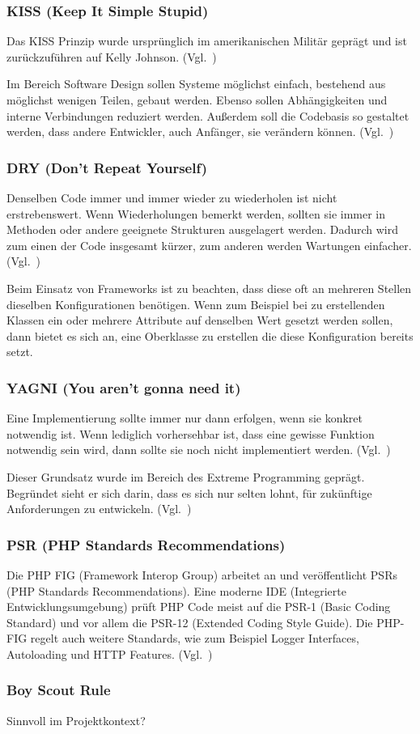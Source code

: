 \subsubsection{KISS (Keep It Simple Stupid)}
Das KISS Prinzip wurde ursprünglich im amerikanischen Militär geprägt und ist zurückzuführen auf Kelly Johnson.
(Vgl.~\cite{kelly-johnson-memoir})

Im Bereich Software Design sollen Systeme möglichst einfach, bestehend aus möglichst wenigen Teilen, gebaut werden.
Ebenso sollen Abhängigkeiten und interne Verbindungen reduziert werden.
Außerdem soll die Codebasis so gestaltet werden, dass andere Entwickler, auch Anfänger, sie verändern können.
(Vgl.~\cite{kiss-principle-explained})

\subsubsection{DRY (Don’t Repeat Yourself)}
Denselben Code immer und immer wieder zu wiederholen ist nicht erstrebenswert.
Wenn Wiederholungen bemerkt werden, sollten sie immer in Methoden oder andere geeignete Strukturen ausgelagert werden.
Dadurch wird zum einen der Code insgesamt kürzer, zum anderen werden Wartungen einfacher.
(Vgl.~\cite{the-pragmatic-programmer})

Beim Einsatz von Frameworks ist zu beachten, dass diese oft an mehreren Stellen dieselben Konfigurationen benötigen.
Wenn zum Beispiel bei zu erstellenden Klassen ein oder mehrere Attribute auf denselben Wert gesetzt werden sollen, dann bietet es sich an, eine Oberklasse zu erstellen die diese Konfiguration bereits setzt.

\subsubsection{YAGNI (You aren't gonna need it)}
Eine Implementierung sollte immer nur dann erfolgen, wenn sie konkret notwendig ist.
Wenn lediglich vorhersehbar ist, dass eine gewisse Funktion notwendig sein wird, dann sollte sie noch nicht implementiert werden.
(Vgl.~\cite{extreme-programming-installed})

Dieser Grundsatz wurde im Bereich des Extreme Programming geprägt.
Begründet sieht er sich darin, dass es sich nur selten lohnt, für zukünftige Anforderungen zu entwickeln.
(Vgl.~\cite{kiss-principle-explained})

\subsubsection{PSR (PHP Standards Recommendations)}
Die PHP FIG (Framework Interop Group) arbeitet an und veröffentlicht PSRs (PHP Standards Recommendations).
Eine moderne IDE (Integrierte Entwicklungsumgebung) prüft PHP Code meist auf die PSR-1 (Basic Coding Standard) und vor allem die PSR-12 (Extended Coding Style Guide).
Die PHP-FIG regelt auch weitere Standards, wie zum Beispiel Logger Interfaces, Autoloading und HTTP Features.
(Vgl.~\cite{psr})

\subsubsection{Boy Scout Rule}
Sinnvoll im Projektkontext?

